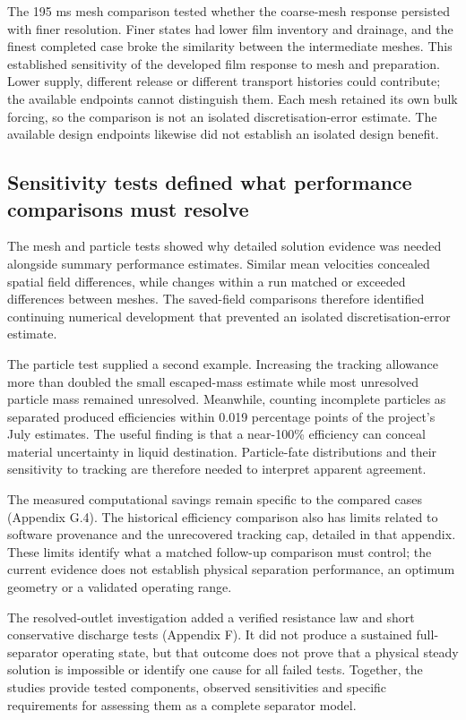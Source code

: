 The 195 ms mesh comparison tested whether the coarse-mesh response persisted with finer resolution. Finer states had lower film inventory and drainage, and the finest completed case broke the similarity between the intermediate meshes. This established sensitivity of the developed film response to mesh and preparation. Lower supply, different release or different transport histories could contribute; the available endpoints cannot distinguish them. Each mesh retained its own bulk forcing, so the comparison is not an isolated discretisation-error estimate. The available design endpoints likewise did not establish an isolated design benefit.

\subsection{Sensitivity tests defined what performance comparisons must resolve}

The mesh and particle tests showed why detailed solution evidence was needed alongside summary performance estimates. Similar mean velocities concealed spatial field differences, while changes within a run matched or exceeded differences between meshes. The saved-field comparisons therefore identified continuing numerical development that prevented an isolated discretisation-error estimate.

The particle test supplied a second example. Increasing the tracking allowance more than doubled the small escaped-mass estimate while most unresolved particle mass remained unresolved. Meanwhile, counting incomplete particles as separated produced efficiencies within 0.019 percentage points of the project's July estimates. The useful finding is that a near-100\% efficiency can conceal material uncertainty in liquid destination. Particle-fate distributions and their sensitivity to tracking are therefore needed to interpret apparent agreement.

The measured computational savings remain specific to the compared cases (Appendix G.4). The historical efficiency comparison also has limits related to software provenance and the unrecovered tracking cap, detailed in that appendix. These limits identify what a matched follow-up comparison must control; the current evidence does not establish physical separation performance, an optimum geometry or a validated operating range.

The resolved-outlet investigation added a verified resistance law and short conservative discharge tests (Appendix F). It did not produce a sustained full-separator operating state, but that outcome does not prove that a physical steady solution is impossible or identify one cause for all failed tests. Together, the studies provide tested components, observed sensitivities and specific requirements for assessing them as a complete separator model.
